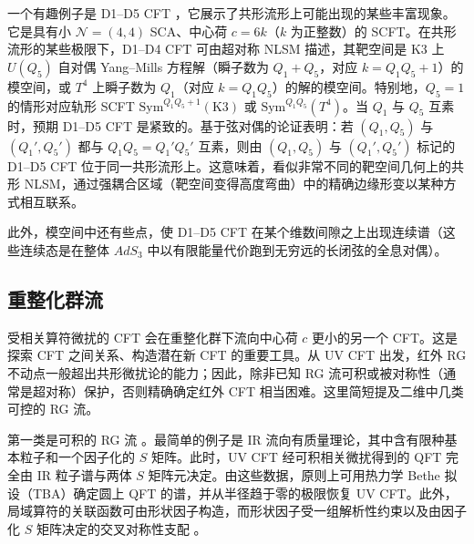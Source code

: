 
一个有趣例子是 D1--D5 CFT \cite{r39,r40,r41}，它展示了共形流形上可能出现的某些丰富现象。它是具有小 $\mathcal{N}=(4,4)$ SCA、中心荷 $c=6k$（$k$ 为正整数）的 SCFT。在共形流形的某些极限下，D1--D4 CFT 可由超对称 NLSM 描述，其靶空间是 K3 上 $U(Q_5)$ 自对偶 Yang--Mills 方程解（瞬子数为 $Q_1+Q_5$，对应 $k=Q_1Q_5+1$）的模空间，或 $T^4$ 上瞬子数为 $Q_1$（对应 $k=Q_1Q_5$）的解的模空间。特别地，$Q_5=1$ 的情形对应轨形 SCFT $\mathrm{Sym}^{Q_1Q_5+1}(\mathrm{K3})$ 或 $\mathrm{Sym}^{Q_1Q_5}(T^4)$。当 $Q_1$ 与 $Q_5$ 互素时，预期 D1--D5 CFT 是紧致的。基于弦对偶的论证表明：若 $(Q_1,Q_5)$ 与 $(Q_1',Q_5')$ 都与 $Q_1Q_5=Q_1'Q_5'$ 互素，则由 $(Q_1,Q_5)$ 与 $(Q_1',Q_5')$ 标记的 D1--D5 CFT 位于同一共形流形上。这意味着，看似非常不同的靶空间几何上的共形 NLSM，通过强耦合区域（靶空间变得高度弯曲）中的精确边缘形变以某种方式相互联系。


此外，模空间中还有些点，使 D1--D5 CFT 在某个维数间隙之上出现连续谱（这些连续态是在整体 $AdS_3$ 中以有限能量代价跑到无穷远的长闭弦的全息对偶）。

\subsection{重整化群流}

受相关算符微扰的 CFT 会在重整化群下流向中心荷 $c$ 更小的另一个 CFT。这是探索 CFT 之间关系、构造潜在新 CFT 的重要工具。从 UV CFT 出发，红外 RG 不动点一般超出共形微扰论的能力；因此，除非已知 RG 流可积或被对称性（通常是超对称）保护，否则精确确定红外 CFT 相当困难。这里简短提及二维中几类可控的 RG 流。

第一类是可积的 RG 流 \cite{r42,r43,r44,r45,r46,r47}。最简单的例子是 IR 流向有质量理论，其中含有限种基本粒子和一个因子化的 $S$ 矩阵。此时，UV CFT 经可积相关微扰得到的 QFT 完全由 IR 粒子谱与两体 $S$ 矩阵元决定。由这些数据，原则上可用热力学 Bethe 拟设（TBA）确定圆上 QFT 的谱，并从半径趋于零的极限恢复 UV CFT。此外，局域算符的关联函数可由形状因子构造，而形状因子受一组解析性约束以及由因子化 $S$ 矩阵决定的交叉对称性支配 \cite{r48,r49}。

